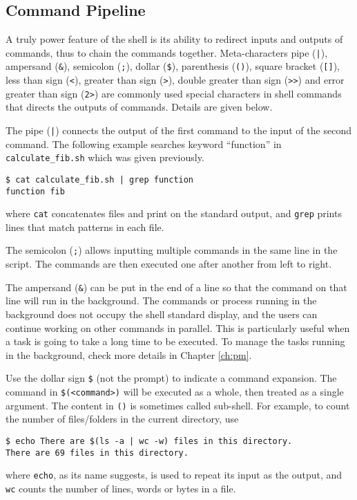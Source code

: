 \subsection{Command Pipeline}

A truly power feature of the shell is its ability to redirect inputs and outputs of commands, thus to chain the commands together. Meta-characters pipe (\verb?|?), ampersand (\verb|&|), semicolon (\verb|;|), dollar (\verb|$|), parenthesis (\verb|()|), square bracket (\verb|[]|), less than sign (\verb|<|), greater than sign (\verb|>|), double greater than sign (\verb|>>|) and error greater than sign (\verb|2>|) are commonly used special characters in shell commands that directs the outputs of commands. Details are given below.

The pipe (\verb$|$) connects the output of the first command to the input of the second command. The following example searches keyword ``function'' in \verb|calculate_fib.sh| which was given previously.
\begin{lstlisting}
$ cat calculate_fib.sh | grep function
function fib
\end{lstlisting}
where \verb|cat| concatenates files and print on the standard output, and \verb|grep| prints lines that match patterns in each file.

The semicolon (\verb|;|) allows inputting multiple commands in the same line in the script. The commands are then executed one after another from left to right.

The ampersand (\verb|&|) can be put in the end of a line so that the command on that line will run in the background. The commands or process running in the background does not occupy the shell standard display, and the users can continue working on other commands in parallel. This is particularly useful when a task is going to take a long time to be executed. To manage the tasks running in the background, check more details in Chapter \ref{ch:pm}.

Use the dollar sign \verb|$| (not the prompt) to indicate a command expansion. The command in \verb|$(<command>)| will be executed as a whole, then treated as a single argument. The content in \verb|()| is sometimes called sub-shell. For example, to count the number of files/folders in the current directory, use
\begin{lstlisting}
$ echo There are $(ls -a | wc -w) files in this directory.
There are 69 files in this directory.
\end{lstlisting}
where \verb|echo|, as its name suggests, is used to repeat its input as the output, and \verb|wc| counts the number of lines, words or bytes in a file.

